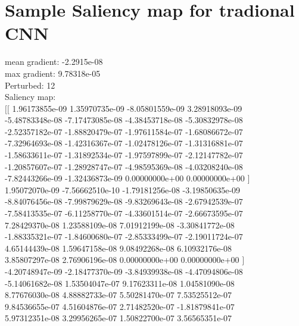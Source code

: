 \documentclass{article}
\begin{document}
\section{Sample Saliency map for tradional CNN}
mean gradient: -2.2915e-08\\
max gradient: 9.78318e-05\\
Perturbed: 12\\
Saliency map:\\
$[[$  1.96173855e-09   1.35970735e-09  -8.05801559e-09   3.28918093e-09 \\
   -5.48783348e-08  -7.17473085e-08  -4.38453718e-08  -5.30832978e-08 \\
   -2.52357182e-07  -1.88820479e-07  -1.97611584e-07  -1.68086672e-07 \\
   -7.32964693e-08  -1.42316367e-07  -1.02478126e-07  -1.31316881e-07 \\
   -1.58633611e-07  -1.31892534e-07  -1.97597899e-07  -2.12147782e-07 \\
   -1.20857607e-07  -1.28928747e-07  -4.98595369e-08  -4.03208240e-08 \\
   -7.82443266e-09  -1.32436873e-09   0.00000000e+00   0.00000000e+00 $]$ \\
    1.95072070e-09  -7.56662510e-10  -1.79181256e-08  -3.19850635e-09 \\
   -8.84076456e-08  -7.99879629e-08  -9.83269643e-08  -2.67942539e-07 \\
   -7.58413535e-07  -6.11258770e-07  -4.33601514e-07  -2.66673595e-07 \\
    7.28429370e-08   1.23588109e-08   7.01912199e-08  -3.30841772e-08 \\
   -1.88335321e-07  -1.84600680e-07  -2.85333499e-07  -2.19011724e-07 \\
    4.65144439e-08   1.59647158e-08   9.08492268e-08   6.10932176e-08 \\
	3.85807297e-08   2.76906196e-08   0.00000000e+00   0.00000000e+00 $]$ \\
   -4.20748947e-09  -2.18477370e-09  -3.84939938e-08  -4.47094806e-08 \\
   -5.14061682e-08   1.53504047e-07   9.17623311e-08   1.04581090e-08 \\
    8.77676030e-08   4.88882733e-07   5.50281470e-07   7.53525512e-07 \\
    9.84536655e-07   4.51604876e-07   2.71482520e-07  -1.81879841e-07 \\
    5.97312351e-08   3.29956265e-07   1.50822700e-07   3.56565351e-07 \\
\end{document}

